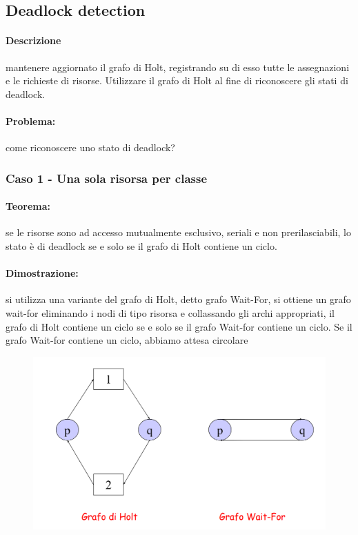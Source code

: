 \subsection{Deadlock detection}
\paragraph{Descrizione} mantenere aggiornato il grafo di Holt, registrando su di esso tutte le assegnazioni e le richieste di risorse. Utilizzare il grafo di Holt al fine di riconoscere gli stati di deadlock.

\paragraph{Problema:} come riconoscere uno stato di deadlock?

\subsubsection{Caso 1 - Una sola risorsa per classe}

\paragraph{Teorema:} se le risorse sono ad accesso mutualmente esclusivo, seriali e non prerilasciabili, lo stato è di deadlock se e solo se il grafo di Holt contiene un ciclo.

\paragraph{Dimostrazione:} si utilizza una variante del grafo di Holt, detto grafo Wait-For, si ottiene un grafo wait-for eliminando i nodi di tipo risorsa e collassando gli archi appropriati, il grafo di Holt contiene un ciclo se e solo se il grafo Wait-for contiene un ciclo.
Se il grafo Wait-for contiene un ciclo, abbiamo attesa circolare

\begin{figure}[h]
    \centering
    \includegraphics[width=0.4\linewidth]{Images/Screenshot 2024-12-30 at 18-14-14 so-04-risorse - so-04-risorse.pdf.png}
\end{figure}

